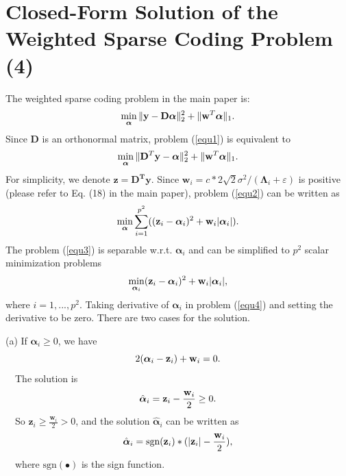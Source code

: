 \documentclass[10pt,onecolumn,letterpaper]{article}
\begin{document}
\section{Closed-Form Solution of the Weighted Sparse Coding Problem (4)}
The weighted sparse coding problem in the main paper is:
\begin{equation}\label{equ1}
\setlength{\abovedisplayskip}{1pt}
\setlength{\belowdisplayskip}{1pt}
\min_{\boldsymbol{\alpha}}\|\mathbf{y}-\mathbf{D}\boldsymbol{\alpha}\|_{2}^{2}+\|\mathbf{w}^{T}\boldsymbol{\alpha}\|_{1}.
\end{equation}
Since $\mathbf{D}$ is an orthonormal matrix, problem (\ref{equ1}) is equivalent to 
\begin{equation}\label{equ2}
\setlength{\abovedisplayskip}{1pt}
\setlength{\belowdisplayskip}{1pt}
\min_{\boldsymbol{\alpha}}\|\mathbf{D}^{T}\mathbf{y}-\boldsymbol{\alpha}\|_{2}^{2}+\|\mathbf{w}^{T}\boldsymbol{\alpha}\|_{1}.
\end{equation}
For simplicity, we denote $\mathbf{z} = \mathbf{D^{T}y}$. Since $\mathbf{w}_{i}=c*2\sqrt{2}\sigma^{2}/(\mathbf{\Lambda}_{i}+\varepsilon)$ is positive (please refer to Eq. (18) in the main paper), problem (\ref{equ2}) can be written as
\begin{equation}\label{equ3}
\setlength{\abovedisplayskip}{0.01pt}
\setlength{\belowdisplayskip}{0.01pt}
\min_{\boldsymbol{\alpha}}\sum_{i=1}^{p^{2}}((\mathbf{z}_{i}-\boldsymbol{\alpha}_{i})^{2}+\mathbf{w}_{i}|\boldsymbol{\alpha}_{i}|).
\end{equation}
The problem (\ref{equ3}) is separable w.r.t. $\boldsymbol{\alpha}_{i}$ and can be simplified to $p^{2}$ scalar minimization problems
\begin{equation}\label{equ4}
\setlength{\abovedisplayskip}{2pt}
\setlength{\belowdisplayskip}{1pt}
\min_{\boldsymbol{\alpha}_{i}}(\mathbf{z}_{i}-\boldsymbol{\alpha}_{i})^{2}+\mathbf{w}_{i}|\boldsymbol{\alpha}_{i}|,
\end{equation}
where $i=1,...,p^{2}$. Taking derivative of $\boldsymbol{\alpha}_{i}$ in problem (\ref{equ4}) and setting the derivative to be zero. There are two cases for the solution.

(a) If $\boldsymbol{\alpha}_{i}\ge 0$, we have
\begin{equation}\label{equ5}
\setlength{\abovedisplayskip}{0.1pt}
\setlength{\belowdisplayskip}{0.11pt}
2(\boldsymbol{\alpha}_{i}-\mathbf{z}_{i})+\mathbf{w}_{i}=0.
\end{equation}
\qquad\ \  The solution is
\begin{equation}\label{equ6}
\setlength{\abovedisplayskip}{0.1pt}
\setlength{\belowdisplayskip}{0.1pt}
\hat{\boldsymbol{\alpha}}_{i}=\mathbf{z}_{i}-\frac{\mathbf{w}_{i}}{2} \ge 0.
\end{equation}
\qquad\ \  So $\mathbf{z}_{i}\ge\frac{\mathbf{w}_{i}}{2}> 0$, and the solution $\hat{\boldsymbol{\alpha}}_{i}$ can be written as
\begin{equation}\label{equ7}
\setlength{\abovedisplayskip}{0.1pt}
\setlength{\belowdisplayskip}{0.1pt}
\hat{\boldsymbol{\alpha}}_{i}=\text{sgn}(\mathbf{z}_{i})*(|\mathbf{z}_{i}|-\frac{\mathbf{w}_{i}}{2}),
\end{equation}
\qquad\ \  where $\text{sgn}(\bullet)$ is the sign function. 
\end{document}

